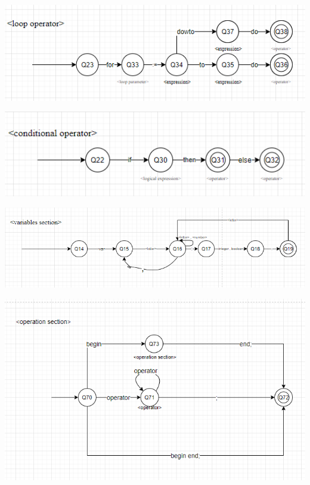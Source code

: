 \documentclass[12pt]{article}
\begin{document}
\includegraphics[width=1\textwidth]{assets/Оператор for.png}

\includegraphics[width=1\textwidth]{assets/Оператор if.png}

\includegraphics[width=1\textwidth]{assets/Секция Var.png}

\includegraphics[width=1\textwidth]{assets/Секция Операторов.png}
\end{document}
